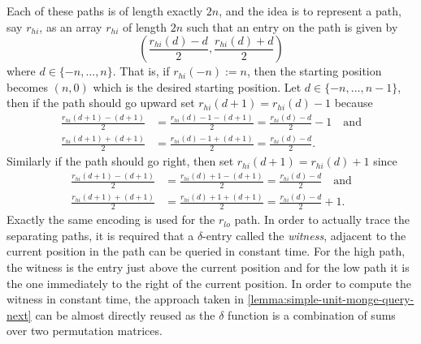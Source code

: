 \documentclass[twoside,11pt,openright]{report}
\begin{document}
Each of these paths is of length exactly $2n$, and the idea is to represent a path, say $r_{hi}$, as an array $r_{hi}$ of length $2n$ such that an entry on the path is given by
\[
  \left( \frac{r_{hi}(d) - d}{2}, \frac{r_{hi}(d) + d}{2} \right)
\]
where $d \in \{-n, \dots, n\}$. That is, if $r_{hi}(-n) := n$, then the starting position becomes $(n, 0)$ which is the desired starting position. Let $d \in \{-n, \dots, n - 1\}$, then if the path should go upward set $r_{hi}(d + 1) = r_{hi}(d) - 1$ because
\begin{align*}
  \frac{r_{hi}(d + 1) - (d + 1)}{2} &= \frac{r_{hi}(d) - 1 - (d + 1)}{2} = \frac{r_{hi}(d) - d}{2} - 1 \quad \text{and} \\
  \frac{r_{hi}(d + 1) + (d + 1)}{2} &= \frac{r_{hi}(d) - 1 + (d + 1)}{2} = \frac{r_{hi}(d) - d}{2}.
\end{align*}
Similarly if the path should go right, then set $r_{hi}(d + 1) = r_{hi}(d) + 1$ since
\begin{align*}
  \frac{r_{hi}(d + 1) - (d + 1)}{2} &= \frac{r_{hi}(d) + 1 - (d + 1)}{2} = \frac{r_{hi}(d) - d}{2} \quad \text{and} \\
  \frac{r_{hi}(d + 1) + (d + 1)}{2} &= \frac{r_{hi}(d) + 1 + (d + 1)}{2} = \frac{r_{hi}(d) - d}{2} + 1.
\end{align*}
Exactly the same encoding is used for the $r_{lo}$ path. In order to actually trace the separating paths, it is required that a $\delta$-entry called the \textit{witness}, adjacent to the current position in the path can be queried in constant time. For the high path, the witness is the entry just above the current position and for the low path it is the one immediately to the right of the current position. In order to compute the witness in constant time, the approach taken in \cref{lemma:simple-unit-monge-query-next} can be almost directly reused as the $\delta$ function is a combination of sums over two permutation matrices.
\end{document}
